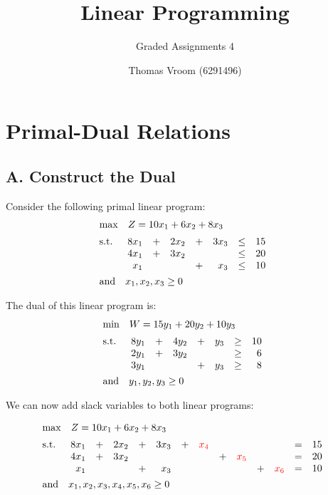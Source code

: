 \documentclass[12pt]{article}
\title{Linear Programming}
\subtitle{Graded Assignments 4}
\author{Thomas Vroom (6291496)}
\begin{document}
\maketitle

%
%
\section{Primal-Dual Relations}
\subsection{A. Construct the Dual}
Consider the following primal linear program:
\begin{align*}
  &\mathrm{max} \quad Z = 10x_1 + 6x_2 + 8x_3 \\[2pt]
  &\mathrm{s.t.} \quad 
  \begin{array}[t]{r c r c r c r}
      8x_1 & + & 2x_2 & + & 3x_3 & \leq & 15 \\
      4x_1 & + & 3x_2 & & & \leq & 20 \\
      x_1 & & & + & x_3 & \leq & 10
  \end{array}\\
  &\mathrm{and} \quad x_1, x_2, x_3 \geq 0
\end{align*}

\noindent
The dual of this linear program is:
\begin{align*}
  &\mathrm{min} \quad W = 15y_1 + 20y_2 + 10y_3 \\[2pt]
  &\mathrm{s.t.} \quad 
  \begin{array}[t]{r c r c r c r}
      8y_1 & + & 4y_2 & + & y_3 & \geq & 10 \\
      2y_1 & + & 3y_2 & & & \geq & 6 \\
      3y_1 & & & + & y_3 & \geq & 8
  \end{array}\\
  &\mathrm{and} \quad y_1, y_2, y_3 \geq 0
\end{align*}

\noindent
We can now add slack variables to both linear programs:

\begin{align*}
  &\mathrm{max} \quad Z = 10x_1 + 6x_2 + 8x_3 \\[2pt]
  &\mathrm{s.t.} \quad 
  \begin{array}[t]{r c r c r c r c r c r c r c}
      8x_1 & + & 2x_2 & + & 3x_3 & + & \textcolor{red}{x_4} & & & & & = & 15 \\
      4x_1 & + & 3x_2 & & & & & + & \textcolor{red}{x_5} & & & = & 20 \\
      x_1 & & & + & x_3 & & & & & + & \textcolor{red}{x_6} & = & 10
  \end{array}\\
  &\mathrm{and} \quad x_1, x_2, x_3, x_4, x_5, x_6 \geq 0
\end{align*}
\end{document}
